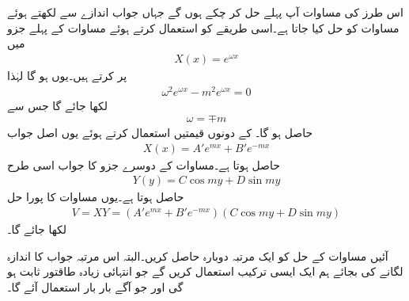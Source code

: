 اس طرز کی مساوات آپ پہلے حل کر چکے ہوں گے جہاں جواب اندازے سے لکھتے ہوئے مساوات کو حل کیا جاتا ہے۔اسی طریقے کو استعمال کرتے ہوئے مساوات  کے پہلے جزو میں
\begin{align*}
X(x)=e^{\omega x}
\end{align*}
پر کرتے ہیں۔یوں  ہو گا لہٰذا
\begin{align*}
\omega^2 e^{\omega x}-m^2 e^{\omega x}=0
\end{align*}
لکھا جائے گا جس سے 
\begin{align*}
\omega = \mp m
\end{align*}
حاصل ہو گا۔ کے دونوں قیمتیں استعمال کرتے ہوئے یوں اصل جواب
\begin{align}\label{مساوات_لاپلاس_اندازہ_الف}
X(x)=A' e^{mx}+B' e^{-m x}
\end{align} 
حاصل ہوتا ہے۔مساوات  کے دوسرے جزو کا جواب اسی طرح
\begin{align}\label{مساوات_لاپلاس_اندازہ_ب}
Y(y)=C \cos m y+D \sin m y
\end{align}
حاصل ہوتا ہے۔یوں مساوات  کا پورا حل
\begin{align}\label{مساوات_لاپلاس_اندازہ_پ}
V=XY=\left(A' e^{mx}+B' e^{-m x} \right) \left(C \cos m y+D \sin m y \right)
\end{align}
لکھا جائے گا۔

آئیں مساوات  کے حل کو ایک مرتبہ دوبارہ حاصل کریں۔البتہ اس مرتبہ جواب کا اندازہ لگانے کی بجائے ہم ایک ایسی ترکیب استعمال کریں گے جو انتہائی زیادہ طاقتور ثابت ہو گی اور جو آگے بار بار استعمال آئے گا۔

